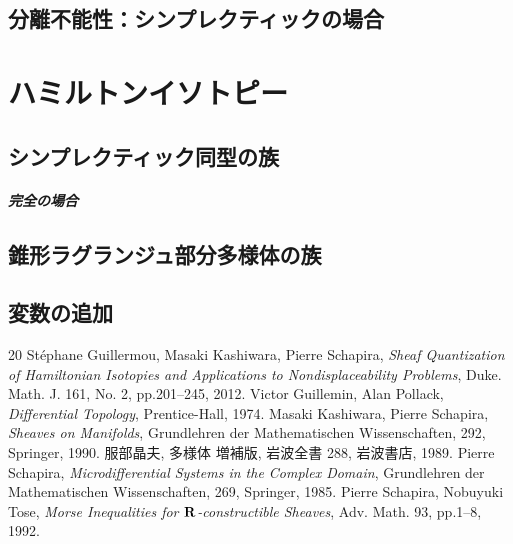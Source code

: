 \subsection{分離不能性：シンプレクティックの場合}\label{ssec44}

\appendix


\section{ハミルトンイソトピー}

\subsection{シンプレクティック同型の族}

\subparagraph*{完全の場合}

\subsection{錐形ラグランジュ部分多様体の族}

\subsection{変数の追加}



\begin{thebibliography}{20} 
   St\'ephane Guillermou, 
  Masaki Kashiwara, Pierre Schapira, 
  \textit{Sheaf Quantization of Hamiltonian Isotopies and Applications to Nondisplaceability Problems}, 
  Duke. Math. J. 161, No. 2, pp.201--245, 2012.  
   Victor Guillemin, Alan Pollack, 
    \textit{Differential Topology}, 
    Prentice-Hall, 1974.
   Masaki Kashiwara, Pierre Schapira, 
    \textit{Sheaves on Manifolds}, 
    Grundlehren der Mathematischen Wissenschaften, 292, Springer, 1990.
   服部晶夫, 多様体 増補版, 岩波全書 288, 岩波書店, 1989.
   Pierre Schapira, 
    \textit{Microdifferential Systems in the Complex Domain}, 
    Grundlehren der Mathematischen Wissenschaften, 269, 
    Springer, 1985.
     Pierre Schapira, Nobuyuki Tose, 
    \textit{Morse Inequalities for \(\mathbf{R}\)-constructible Sheaves}, 
    Adv. Math. 93, pp.1--8, 1992. 
\end{thebibliography}






